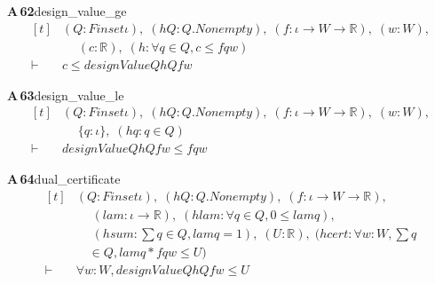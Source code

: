 \documentclass[conference]{IEEEtran}
\theoremstyle{definition}
\newcommand{\lean}[1]{\textsf{\footnotesize #1}}
\begin{document}
\noindent\textbf{A\,62}\quad\lean{design\_value\_ge}
{\footnotesize\[ \begin{aligned}[t]
&(\mathit{Q} : \mathit{Finset} \iota ),\; (\mathit{hQ} : \mathit{Q}.\mathit{Nonempty}),\; (\mathit{f} : \iota \to \mathit{W} \to \mathbb{R} ),\; (\mathit{w} : \mathit{W}),\\
&\quad \; (\mathit{c} : \mathbb{R} ),\; (\mathit{h} : \forall \mathit{q} \in \mathit{Q}, \mathit{c} \leq \mathit{f} \mathit{q} \mathit{w})\\
\vdash\;&\mathit{c} \leq \mathit{designValue} \mathit{Q} \mathit{hQ} \mathit{f} \mathit{w}
\end{aligned} \]}

\noindent\textbf{A\,63}\quad\lean{design\_value\_le}
{\footnotesize\[ \begin{aligned}[t]
&(\mathit{Q} : \mathit{Finset} \iota ),\; (\mathit{hQ} : \mathit{Q}.\mathit{Nonempty}),\; (\mathit{f} : \iota \to \mathit{W} \to \mathbb{R} ),\; (\mathit{w} : \mathit{W}),\\
&\quad \; \{ \mathit{q} : \iota \},\; (\mathit{hq} : \mathit{q} \in \mathit{Q})\\
\vdash\;&\mathit{designValue} \mathit{Q} \mathit{hQ} \mathit{f} \mathit{w} \leq \mathit{f} \mathit{q} \mathit{w}
\end{aligned} \]}

\noindent\textbf{A\,64}\quad\lean{dual\_certificate}
{\footnotesize\[ \begin{aligned}[t]
&(\mathit{Q} : \mathit{Finset} \iota ),\; (\mathit{hQ} : \mathit{Q}.\mathit{Nonempty}),\; (\mathit{f} : \iota \to \mathit{W} \to \mathbb{R} ),\\
&\quad \; (\mathit{lam} : \iota \to \mathbb{R} ),\; (\mathit{hlam} : \forall \mathit{q} \in \mathit{Q}, 0 \leq \mathit{lam} \mathit{q}),\\
&\quad \; (\mathit{hsum} : \textstyle\sum \mathit{q} \in \mathit{Q}, \mathit{lam} \mathit{q} = 1),\; (\mathit{U} : \mathbb{R} ),\; (\mathit{hcert} : \forall \mathit{w} : \mathit{W}, \textstyle\sum \mathit{q}\\
&\quad \in \mathit{Q}, \mathit{lam} \mathit{q} * \mathit{f} \mathit{q} \mathit{w} \leq \mathit{U})\\
\vdash\;&\forall \mathit{w} : \mathit{W}, \mathit{designValue} \mathit{Q} \mathit{hQ} \mathit{f} \mathit{w} \leq \mathit{U}
\end{aligned} \]}
\end{document}
